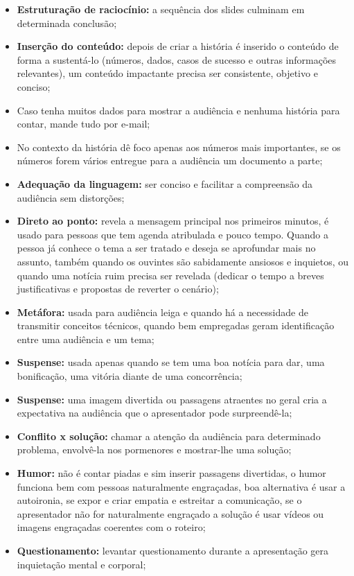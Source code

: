 \begin{itemize}
    \item \textbf{Estruturação de raciocínio:} a sequência dos slides culminam em determinada conclusão;
    \item \textbf{Inserção do conteúdo:} depois de criar a história é inserido o conteúdo de forma a sustentá-lo (números, dados, casos de sucesso e outras informações relevantes), um conteúdo impactante precisa ser consistente, objetivo e conciso;
    \item Caso tenha muitos dados para mostrar a audiência e nenhuma história para contar, mande tudo por e-mail;
    \item No contexto da história dê foco apenas aos números mais importantes, se os números forem vários entregue para a audiência um documento a parte;
    \item \textbf{Adequação da linguagem:} ser conciso e facilitar a compreensão da audiência sem distorções;
    \item \textbf{Direto ao ponto:} revela a mensagem principal nos primeiros minutos, é usado para pessoas que tem agenda atribulada e pouco tempo. Quando a pessoa já conhece o tema a ser tratado e deseja se aprofundar mais no assunto, também quando os ouvintes são sabidamente ansiosos e inquietos, ou quando uma notícia ruim precisa ser revelada (dedicar o tempo a breves justificativas e propostas de reverter o cenário);
    \item \textbf{Metáfora:} usada para audiência leiga e quando há a necessidade de transmitir conceitos técnicos, quando bem empregadas geram identificação entre uma audiência e um tema;
    \item \textbf{Suspense:} usada apenas quando se tem uma boa notícia para dar, uma bonificação, uma vitória diante de uma concorrência;
    \item \textbf{Suspense:} uma imagem divertida ou passagens atraentes no geral cria a expectativa na audiência que o apresentador pode surpreendê-la;
    \item \textbf{Conflito x solução:} chamar a atenção da audiência para determinado problema, envolvê-la nos pormenores e mostrar-lhe uma solução;
    \item \textbf{Humor:} não é contar piadas e sim inserir passagens divertidas, o humor funciona bem com pessoas naturalmente engraçadas, boa alternativa é usar a autoironia, se expor e criar empatia e estreitar a comunicação, se o apresentador não for naturalmente engraçado a solução é usar vídeos ou imagens engraçadas coerentes com o roteiro;
    \item \textbf{Questionamento:} levantar questionamento durante a apresentação gera inquietação mental e corporal;

\end{itemize}
